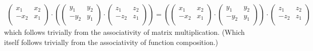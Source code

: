 \documentclass{article}
\begin{document}
\begin{enumerate}
\begin{enumerate}[label={(\roman*)}]
\begin{align*}
            \begin{pmatrix}
                x_1 & x_2 \\ -x_2 & x_1 \\
            \end{pmatrix} \cdot \left(
                \begin{pmatrix}
                    y_1 & y_2 \\ -y_2 & y_1 \\
                \end{pmatrix}
                \cdot
                \begin{pmatrix}
                    z_1 & z_2 \\ -z_2 & z_1 \\
                \end{pmatrix}
            \right) = \left(
                \begin{pmatrix}
                    x_1 & x_2 \\ -x_2 & x_1 \\
                \end{pmatrix} \cdot 
                \begin{pmatrix}
                    y_1 & y_2 \\ -y_2 & y_1 \\
                \end{pmatrix}
            \right)
            \cdot
            \begin{pmatrix}
                z_1 & z_2 \\ -z_2 & z_1 \\
            \end{pmatrix}
        \end{align*}
        which follows trivially from the associativity of matrix multiplication. (Which itself follows trivially from the associativity of function composition.)


\end{enumerate}
\end{enumerate}
\end{document}
